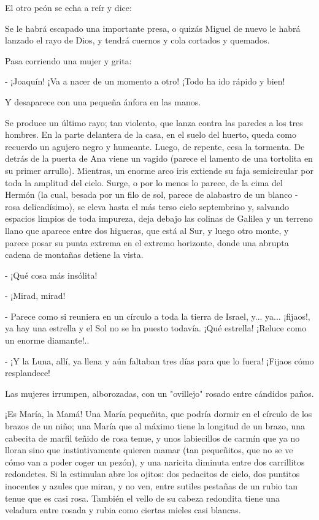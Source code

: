 \documentclass[12pt, twoside, openright]{book} %
\begin{document}
El otro peón se echa a reír y dice: 

Se le habrá escapado una importante presa, o quizás Miguel de nuevo le habrá lanzado el rayo de Dios, y tendrá cuernos y cola cortados y quemados. 

Pasa corriendo una mujer y grita: 

- ¡Joaquín! ¡Va a nacer de un momento a otro! ¡Todo ha ido rápido y bien! 

Y desaparece con una pequeña ánfora en las manos. 

Se produce un último rayo; tan violento, que lanza contra las paredes a los tres hombres. En la parte delantera de la casa, en el suelo del huerto, queda como recuerdo un agujero negro y humeante. Luego, de repente, cesa la tormenta. De detrás de la puerta de Ana viene un vagido (parece el lamento de una tortolita en su primer arrullo). Mientras, un enorme arco iris extiende su faja semicircular por toda la amplitud del cielo. Surge, o por lo menos lo parece, de la cima del Hermón (la cual, besada por un filo de sol, parece de alabastro de un blanco - rosa delicadísimo), se eleva hasta el más terso cielo septembrino y, salvando espacios limpios de toda impureza, deja debajo las colinas de Galilea y un terreno llano que aparece entre dos higueras, que está al Sur, y luego otro monte, y parece posar su punta extrema en el extremo horizonte, donde una abrupta cadena de montañas detiene la vista. 

- ¡Qué cosa más insólita! 

- ¡Mirad, mirad! 

- Parece como si reuniera en un círculo a toda la tierra de Israel, y... ya... ¡fijaos!, ya hay una estrella y el Sol no se ha puesto todavía. ¡Qué estrella! ¡Reluce como un enorme diamante!.. 

- ¡Y la Luna, allí, ya llena y aún faltaban tres días para que lo fuera! ¡Fijaos cómo resplandece! 

Las mujeres irrumpen, alborozadas, con un "ovillejo" rosado entre cándidos paños. 

¡Es María, la Mamá! Una María pequeñita, que podría dormir en el círculo de los brazos de un niño; una María que al máximo tiene la longitud de un brazo, una cabecita de marfil teñido de rosa tenue, y unos labiecillos de carmín que ya no lloran sino que instintivamente quieren mamar (tan pequeñitos, que no se ve cómo van a poder coger un pezón), y una naricita diminuta entre dos carrillitos redondetes. Si la estimulan abre los ojitos: dos pedacitos de cielo, dos puntitos inocentes y azules que miran, y no ven, entre sutiles pestañas de un rubio tan tenue que es casi rosa. También el vello de su cabeza redondita tiene una veladura entre rosada y rubia como ciertas mieles casi blancas. 
\end{document}
